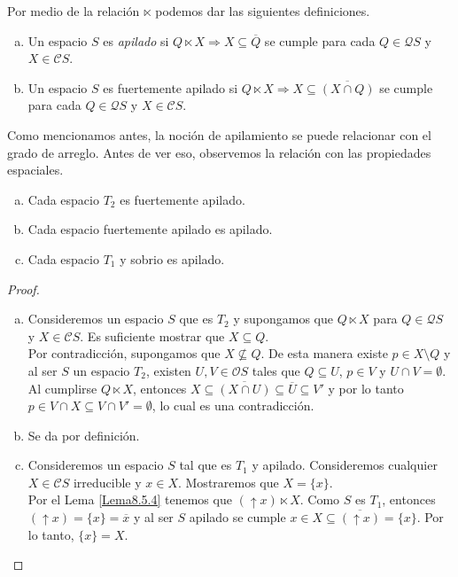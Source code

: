 Por medio de la relación $\ltimes$ podemos dar las siguientes definiciones.

\begin{dfn}\label{Definicion8.5.5}
    \begin{enumerate}[a)]
        \item Un espacio $S$ es \emph{apilado} si $Q\ltimes X \Rightarrow X\subseteq \overline{Q}$ se cumple para cada $Q\in \mathcal{Q}S$ y $X\in \mathcal{C}S$.
        
        \item Un espacio $S$ es fuertemente apilado si $Q\ltimes X \Rightarrow X\subseteq \overline{(X\cap Q)}$ se cumple para cada $Q\in \mathcal{Q}S$ y $X\in \mathcal{C}S$. 
    \end{enumerate}
\end{dfn}

Como mencionamos antes, la noción de apilamiento se puede relacionar con el grado de arreglo. Antes de ver eso, observemos la relación con las propiedades espaciales.

\begin{lem}\label{Lema8.5.6}
    \begin{enumerate}[a)]
        \item Cada espacio $T_2$ es fuertemente apilado.
        \item Cada espacio fuertemente apilado es apilado.
        \item Cada espacio $T_1$ y sobrio es apilado.
    \end{enumerate}
\end{lem}

\begin{proof}
    \begin{enumerate}[a)]
        \item Consideremos un espacio $S$ que es $T_2$ y supongamos que $Q\ltimes X$ para $Q\in \mathcal{Q}S$ y $X\in \mathcal{C}S$. Es suficiente mostrar que $X\subseteq Q$. \\
        
        Por contradicción, supongamos que $X\nsubseteq Q$. De esta manera existe $p\in X\setminus Q$ y al ser $S$ un espacio $T_2$, existen $U, V\in \mathcal{O}S$ tales que $Q\subseteq U$, $p\in V$ y $U\cap V=\emptyset$. Al cumplirse $Q\ltimes X$, entonces $X\subseteq \overline{(X\cap U)}\subseteq \overline{U}\subseteq V'$ y por lo tanto $p\in V\cap X\subseteq V\cap V'=\emptyset$, lo cual es una contradicción.

        \item Se da por definición.

        \item Consideremos un espacio $S$ tal que es $T_1$ y apilado. Consideremos cualquier $X\in \mathcal{C}S$ irreducible y $x\in X$. Mostraremos que $X=\{x\}$.\\

        Por el Lema \ref{Lema8.5.4} tenemos que $(\uparrow x)\ltimes X$.  Como $S$ es $T_1$, entonces $(\uparrow x)=\{x\}=\overline{x}$ y al ser $S$ apilado se cumple $x\in X\subseteq \overline{(\uparrow x)}=\{x\}$. Por lo tanto, $\{x\}=X$.
    \end{enumerate}
\end{proof}

